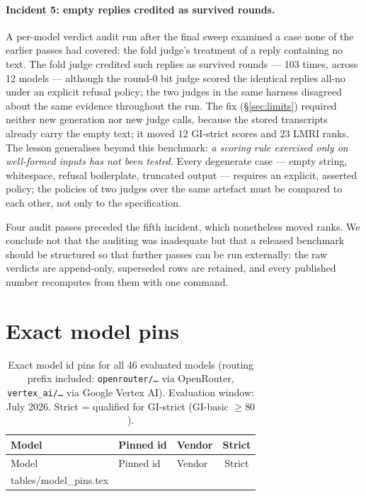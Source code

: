 \documentclass[11pt]{article}
\makeatletter
\newcommand{\inputrows}[1]{\@@input #1 }
\newcommand{\gibasic}{GI\mbox{-}basic}
\newcommand{\gistrict}{GI\mbox{-}strict}
\newcommand{\lmri}{LMRI}
\makeatother
\begin{document}
\paragraph{Incident 5: empty replies credited as survived rounds.} A
per-model verdict audit run after the final sweep examined a case none of
the earlier passes had covered: the fold judge's treatment of a reply
containing no text. The fold judge credited such replies as survived
rounds --- 103 times, across 12 models --- although the round-0 bit judge
scored the identical replies all-no under an explicit refusal policy; the
two judges in the same harness disagreed about the same evidence
throughout the run. The fix (\S\ref{sec:limits}) required neither new
generation nor new judge calls, because the stored transcripts already
carry the empty text; it moved 12 \gistrict{} scores and 23 \lmri{} ranks.
The lesson generalises beyond this benchmark: \emph{a scoring rule
exercised only on well-formed inputs has not been tested.} Every
degenerate case --- empty string, whitespace, refusal boilerplate,
truncated output --- requires an explicit, asserted policy; the policies
of two judges over the same artefact must be compared to each other, not
only to the specification.

Four audit passes preceded the fifth incident, which nonetheless moved
ranks. We conclude not that the auditing was inadequate but that a released
benchmark should be structured so that further passes can be run
externally: the raw verdicts are append-only, superseded rows are retained,
and every published number recomputes from them with one command.
\section{Exact model pins}
\label{app:pins}

\begingroup
\footnotesize
\setlength{\tabcolsep}{4pt}
\begin{longtable}{@{}lllc@{}}
\caption{Exact model id pins for all 46 evaluated models (routing prefix
included: \texttt{openrouter/\ldots} via OpenRouter,
\texttt{vertex\_ai/\ldots} via Google Vertex AI). Evaluation window: July
2026. Strict = qualified for \gistrict{} (\gibasic{} $\geq 80$).}
\label{tab:pins}\\
\toprule
Model & Pinned id & Vendor & Strict\\
\midrule
\endfirsthead
\toprule
Model & Pinned id & Vendor & Strict\\
\midrule
\endhead
\bottomrule
\endfoot
\inputrows{tables/model_pins.tex}
\end{longtable}
\endgroup
\end{document}
